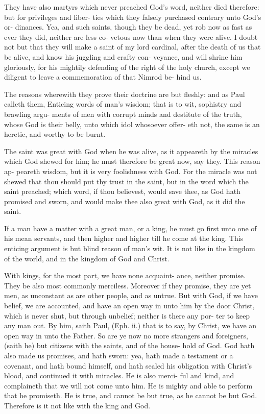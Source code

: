 \documentclass{custom}
\begin{document}
They have also martyrs which never preached God's
word, neither died therefore: but for privileges and liber-
ties which they falsely purchased contrary unto God's or-
dinances. Yea, and such saints, though they be dead,
yet rob now as fast as ever they did, neither are less co-
vetous now than when they were alive. I doubt not but that
they will make a saint of my lord cardinal, after the death
of us that be alive, and know his juggling and crafty con-
veyance, and will shrine him gloriously, for his mightily
defending of the right of the holy church, except we
diligent to leave a commemoration of that Nimrod be- 
hind us. 

The reasons wherewith they prove their doctrine are
but fleshly: and as Paul calleth them, Enticing words of
man's wisdom; that is to wit, sophistry and brawling argu-
ments of men with corrupt minds and destitute of the truth,
whose God is their belly, unto which idol whosoever offer-
eth not, the same is an heretic, and worthy to be burnt. 

The saint was great with God when he was alive, as it 
appeareth by the miracles which God shewed for him; he 
must therefore be great now, say they. This reason ap- 
peareth wisdom, but it is very foolishness with God. For 
the miracle was not shewed that thou should put thy trust
in the saint, but in the word which the saint preached; 
which word, if thou believest, would save thee, as God 
hath promised and sworn, and would make thee also great 
with God, as it did the saint. 

If a man have a matter with a great man, or a king, he 
must go first unto one of his mean servants, and then higher 
and higher till he come at the king. This enticing argument 
is but blind reason of man's wit. It is not like in the
kingdom of the world, and in the kingdom of God and 
Christ. 

With kings, for the most part, we have none acquaint- 
ance, neither promise. They be also most commonly 
merciless. Moreover if they promise, they are yet men, 
as unconstant as are other people, and as untrue. But 
with God, if we have belief, we are accounted, and have 
an open way in unto him by the door Christ, which is 
never shut, but through unbelief; neither is there any por-
ter to keep any man out. By him, saith Paul, (Eph. ii.)
that is to say, by Christ, we have an open way in unto the 
Father. So are ye now no more strangers and foreigners,
(saith he) but citizens with the saints, and of the house- 
hold of God. God hath also made us promises, and hath 
sworn: yea, hath made a testament or a covenant, and hath 
bound himself, and hath sealed his obligation with Christ's 
blood, and continued it with miracles. He is also merci- 
ful and kind, and complaineth that we will not come unto 
him. He is mighty and able to perform that he promiseth.
He is true, and cannot be but true, as he cannot be but
God. Therefore is it not like with the king and God. 
\end{document}
